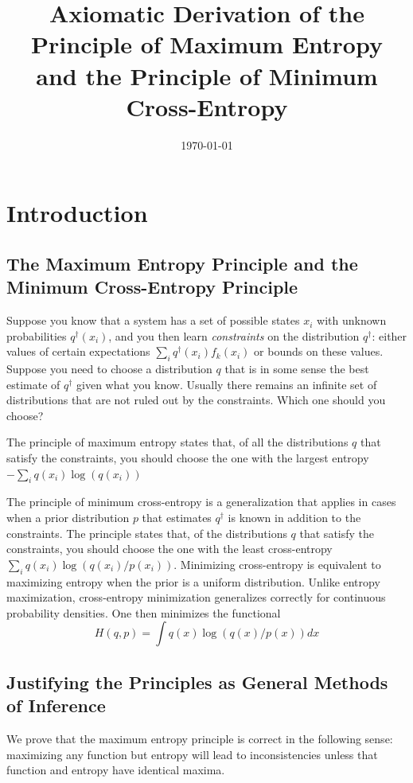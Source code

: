 \documentclass[11pt]{article}
\date{\today}
\title{Axiomatic Derivation of the Principle of Maximum Entropy and the Principle of Minimum Cross-Entropy}
\begin{document}
\maketitle
\section{Introduction}
\label{sec:orgc75d579}

\subsection{The Maximum Entropy Principle and the Minimum Cross-Entropy Principle}
\label{sec:org3ea0e5e}
Suppose you know that a system has a set of possible states \(x_i\) with unknown probabilities
\(q^\dag(x_i)\), and you then learn \emph{constraints} on the distribution \(q^\dag\): either values of
certain expectations \(\sum_iq^\dag(x_i)f_k(x_i)\) or bounds on these values. Suppose you need to
choose a distribution \(q\) that is in some sense the best estimate of \(q^\dag\) given what you know.
Usually there remains an infinite set of distributions that are not ruled out by the constraints.
Which one should you choose?

The principle of maximum entropy states that, of all the distributions \(q\) that satisfy the
constraints, you should choose the one with the largest entropy \(-\sum_iq(x_i)\log(q(x_i))\)

The principle of minimum cross-entropy is a generalization that applies in cases when a prior
distribution \(p\) that estimates \(q^\dag\) is known in addition to the constraints. The principle
states that, of the distributions \(q\) that satisfy the constraints, you should choose the one with
the least cross-entropy \(\sum_iq(x_i)\log(q(x_i)/p(x_i))\). Minimizing cross-entropy is equivalent to
maximizing entropy when the prior is a uniform distribution. Unlike entropy maximization,
cross-entropy minimization generalizes correctly for continuous probability densities. One then
minimizes the functional
\begin{equation}
\label{1}
H(q,p)=\int q(x)\log(q(x)/p(x))dx
\end{equation}
\subsection{Justifying the Principles as General Methods of Inference}
\label{sec:org09f8161}
We prove that the maximum entropy principle is correct in the following sense: maximizing any function
but entropy will lead to inconsistencies unless that function and entropy have identical maxima.
\end{document}
